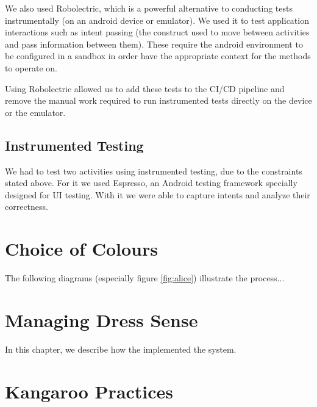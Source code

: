 \documentclass{l3proj}
\begin{document}
We also used Robolectric, which is a powerful alternative to conducting tests instrumentally (on 
an android device or emulator)\cite{Roboelectric}. We used it to test application interactions
such as intent passing (the construct used to move between activities and pass 
information between them). These require the android environment to be configured in
a sandbox in order have the appropriate context for the methods to operate on.

Using Robolectric allowed us to add these tests to the CI/CD pipeline and remove
the manual work required to run instrumented tests directly on the device or the
emulator.

\subsection{Instrumented Testing}

We had to test two activities using instrumented testing, due to the constraints
stated above. For it we used Espresso, an Android testing framework specially 
designed for UI testing. With it we were able to capture intents and analyze their
correctness\cite{Espresso}.






\section{Choice of Colours}
\label{design}

The following diagrams (especially figure \ref{fig:alice}) illustrate the
process...

\section{Managing Dress Sense}
\label{managing}

In this chapter, we describe how the implemented the system.

\section{Kangaroo Practices}



\end{document}
